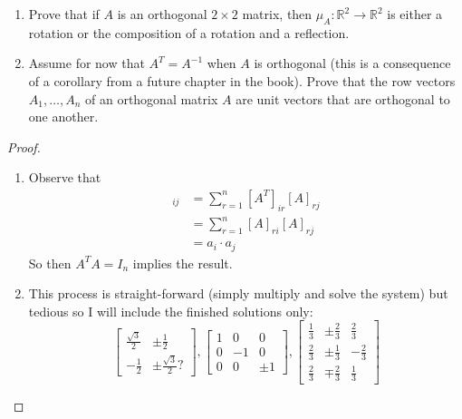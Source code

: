 \begin{exercise}
\begin{enumerate}
        \item Prove that if \( A \) is an orthogonal \( 2 \times 2 \) matrix, then \( \mu_A: \mathbb{R}^2 \rightarrow \mathbb{R}^2 \) is either a rotation or the composition of a rotation and a reflection.
        
        \item Assume for now that \( A^T = A^{-1} \) when \( A \) is orthogonal (this is a consequence of a corollary from a future chapter in the book). Prove that the row vectors \( A_1, \ldots, A_n \) of an orthogonal matrix \( A \) are unit vectors that are orthogonal to one another.
    \end{enumerate}
    
    \begin{proof}
        \begin{enumerate}
            \item Observe that
            \begin{align*}
                [A^TA]_{ij} &= \sum_{r=1}^n [A^T]_{ir} [A]_{rj} \\
                &= \sum_{r=1}^n [A]_{ri} [A]_{rj} \\
                &= a_i \cdot a_j
            \end{align*}
            So then \( A^TA = I_n \) implies the result.
            \item This process is straight-forward (simply multiply and solve the system) but tedious so I will include the finished solutions only:
            \[
                \begin{bmatrix}
                    \frac{\sqrt{3}}{2} & \pm \frac{1}{2} \\ 
                    -\frac{1}{2} & \pm \frac{\sqrt{3}}{2}? 
                \end{bmatrix},
                \begin{bmatrix}
                    1 & 0 & 0 \\ 
                    0 & -1 & 0 \\ 
                    0 & 0 & \pm 1
                \end{bmatrix},
                \begin{bmatrix}
                    \frac{1}{3} & \pm \frac{2}{3} & \frac{2}{3} \\
                    \frac{2}{3} & \pm \frac{1}{3} & -\frac{2}{3} \\
                    \frac{2}{3} & \mp \frac{2}{3} & \frac{1}{3}
                \end{bmatrix}
            \]
            

\end{enumerate}
\end{proof}
\end{exercise}
